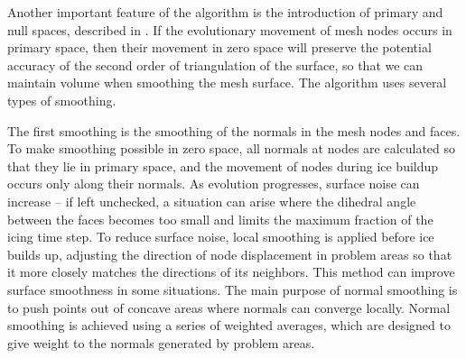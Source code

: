 \documentclass[
11pt,%
tightenlines,%
twoside,%
onecolumn,%
nofloats,%
nobibnotes,%
nofootinbib,%
superscriptaddress,%
noshowpacs,%
centertags]%
{revtex4}
\begin{document}
Another important feature of the algorithm is the introduction of primary and null spaces, described in \cite{Jiao_null_space_smooth}.
If the evolutionary movement of mesh nodes occurs in primary space, then their movement in zero space will preserve the potential accuracy of the second order of triangulation of the surface, so that we can maintain volume when smoothing the mesh surface.
The algorithm uses several types of smoothing.

The first smoothing is the smoothing of the normals in the mesh nodes and faces.
To make smoothing possible in zero space, all normals at nodes are calculated so that they lie in primary space, and the movement of nodes during ice buildup occurs only along their normals.
As evolution progresses, surface noise can increase -- if left unchecked, a situation can arise where the dihedral angle between the faces becomes too small and limits the maximum fraction of the icing time step.
To reduce surface noise, local smoothing is applied before ice builds up, adjusting the direction of node displacement in problem areas so that it more closely matches the directions of its neighbors.
This method can improve surface smoothness in some situations.
The main purpose of normal smoothing is to push points out of concave areas where normals can converge locally.
Normal smoothing is achieved using a series of weighted averages, which are designed to give weight to the normals generated by problem areas.
\end{document}
